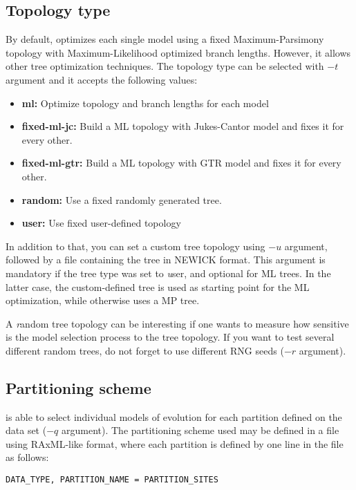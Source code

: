 \subsection{Topology type}
\label{sec:arg:topo}

By default, \modeltest optimizes each single model using a fixed Maximum-Parsimony topology
with Maximum-Likelihood optimized branch lengths.
However, it allows other tree optimization techniques.
The topology type can be selected with $-t$ argument and it accepts the following values:

\begin{itemize}
  \item {\bf ml:} Optimize topology and branch lengths for each model
  \item {\bf fixed-ml-jc:} Build a ML topology with Jukes-Cantor model and fixes it for every other.
  \item {\bf fixed-ml-gtr:} Build a ML topology with GTR model and fixes it for every other.
  \item {\bf random:} Use a fixed randomly generated tree.
  \item {\bf user:} Use fixed user-defined topology
\end{itemize}

In addition to that, you can set a custom tree topology using $-u$ argument, followed by a file containing the tree in NEWICK format.
This argument is mandatory if the tree type was set to {\emph user}, and optional for ML trees.
In the latter case, the custom-defined tree is used as starting point for the ML optimization, while otherwise \modeltest uses a MP tree.

A {\emph random} tree topology can be interesting if one wants to measure how sensitive is the model selection process to the tree topology.
If you want to test several different random trees, do not forget to use different RNG seeds ($-r$ argument).


\subsection{Partitioning scheme}
\label{sec:arg:parts}

\modeltest is able to select individual models of evolution for each partition defined on the data set ($-q$ argument).
The partitioning scheme used may be defined in a file using RAxML-like format, where each partition is defined by one line in the file as follows:

{
\begin{verbatim}
DATA_TYPE, PARTITION_NAME = PARTITION_SITES
\end{verbatim}
}

